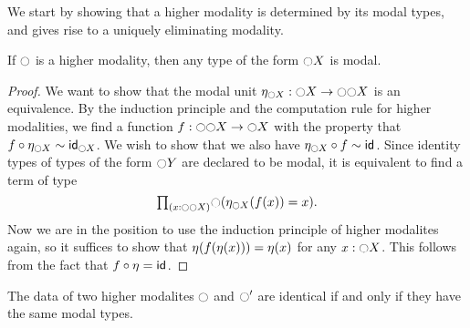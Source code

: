 We start by showing that a higher modality is determined by its modal types, and gives rise to a uniquely eliminating modality.

\begin{lem}
If $\modal$ is a higher modality, then any type of the form $\modal X$ is modal.
\end{lem}

\begin{proof}
  We want to show that the modal unit $\modalunit[\modal X]:\modal X\to\modal\modal X$
is an equivalence. By the induction principle and the computation rule for
higher modalities, we find a function $f:\modal \modal X\to\modal X$ with
the property that $f\circ \modalunit[\modal X]\htpy\idfunc[\modal X]$. We wish to
show that we also have $\modalunit[\modal X]\circ f\htpy\idfunc$. Since identity
types of types of the form $\modal Y$ are declared to be modal, it is
equivalent to find a term of type
\begin{equation*}
\prd{x:\modal \modal X}\modal(\modalunit[\modal X](f(x))=x).
\end{equation*}
Now we are in the position to use the induction principle of higher modalites
again, so it suffices to show that $\modalunit(f(\modalunit(x)))=\modalunit(x)$
for any $x:\modal X$. This follows from the fact that $f\circ\modalunit=\idfunc$.
\end{proof}

\begin{thm}\label{thm:subuniv-highermod}
The data of two higher modalites $\modal$ and $\modal'$
are identical if and only if they have the same modal types.
\end{thm}

